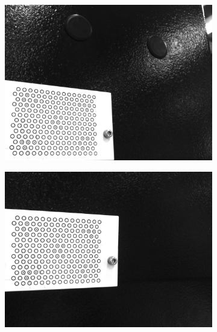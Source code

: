 \begin{figure}[h]
\begin{subfigure}{0.32\textwidth}
        \includegraphics[width=\textwidth]{figures/001calibration/calibration6.png}
    \end{subfigure}\hspace{0cm}
    \begin{subfigure}{0.32\textwidth}
        \centering
        \includegraphics[width=\textwidth]{figures/001calibration/calibration7.png}
    \end{subfigure}
    \begin{subfigure}{0.32\textwidth}
        \centering

\end{subfigure}
\end{figure}
